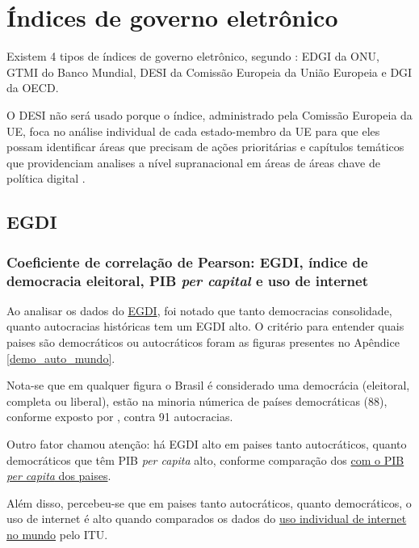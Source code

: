 \section{Índices de governo eletrônico}

Existem 4 tipos de índices de governo eletrônico, segundo \cite{martinez2022egovernment}: EDGI da ONU, GTMI do Banco Mundial, DESI da Comissão Europeia da União Europeia e DGI da OECD.

O DESI não será usado porque o índice, administrado pela Comissão Europeia da UE, foca no análise individual de cada estado-membro da UE para que eles possam identificar áreas que precisam de ações prioritárias e capítulos temáticos que providenciam analises a nível supranacional em áreas de áreas chave de política digital \cite{desi_2022}.

\subsection{EGDI}


\subsubsection{Coeficiente de correlação de Pearson: EGDI, índice de democracia eleitoral, PIB \textit{per capital} e uso de internet}

Ao analisar os dados do \href{https://publicadministration.un.org/egovkb/en-us/About/Overview/-E-Government-Development-Index}{EGDI}, foi notado que tanto democracias consolidade, quanto autocracias históricas tem um EGDI alto. O critério para entender quais paises são democráticos ou autocráticos foram as figuras presentes no Apêndice \ref{demo_auto_mundo}. 

Nota-se que em qualquer figura o Brasil é considerado uma democrácia (eleitoral, completa ou liberal), estão na minoria númerica de países democráticas (88), conforme exposto por \cite{nord2025democracy}, contra 91 autocracias.

Outro fator chamou atenção: há EGDI alto em paises tanto autocráticos, quanto democráticos que têm PIB \textit{per capita} alto, conforme comparação dos \href{https://data.worldbank.org/indicator/NY.GDP.PCAP.PP.KD}{com o PIB \textit{per capita} dos paises}. 

Além disso, percebeu-se que em paises tanto autocráticos, quanto democráticos, o uso de internet é alto quando comparados os dados do \href{https://datahub.itu.int/data/?e=701&i=11624&c=701}{uso individual de internet no mundo} pelo ITU.

